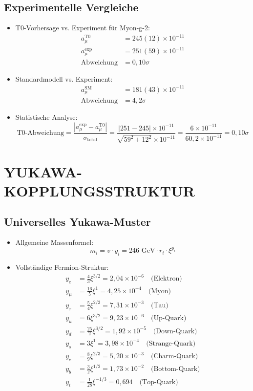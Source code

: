 \documentclass[12pt,a4paper]{article}
\begin{document}
\subsection{Experimentelle Vergleiche}
\begin{itemize}
	\item T0-Vorhersage vs. Experiment f\"{u}r Myon-g-2:
	\begin{align*}
		a_\mu^{\text{T0}} &= 245(12) \times 10^{-11}\\
		a_\mu^{\text{exp}} &= 251(59) \times 10^{-11}\\
		\text{Abweichung} &= 0,10\sigma
	\end{align*}
	
	\item Standardmodell vs. Experiment:
	\begin{align*}
		a_\mu^{\text{SM}} &= 181(43) \times 10^{-11}\\
		\text{Abweichung} &= 4,2\sigma
	\end{align*}
	
	\item Statistische Analyse:
	$$\text{T0-Abweichung} = \frac{|a_\mu^{\text{exp}} - a_\mu^{\text{T0}}|}{\sigma_{\text{total}}} = \frac{|251 - 245| \times 10^{-11}}{\sqrt{59^2 + 12^2} \times 10^{-11}} = \frac{6 \times 10^{-11}}{60,2 \times 10^{-11}} = 0,10\sigma$$
\end{itemize}
\section{YUKAWA-KOPPLUNGSSTRUKTUR}

\subsection{Universelles Yukawa-Muster}
\begin{itemize}
	\item Allgemeine Massenformel:
	$$m_i = v \cdot y_i = 246 \text{ GeV} \cdot r_i \cdot \xi^{p_i}$$
	
	\item Vollständige Fermion-Struktur:
	\begin{align*}
		y_e &= \frac{4}{3}\xi^{3/2} = 2{,}04 \times 10^{-6} \quad \text{(Elektron)}\\
		y_\mu &= \frac{16}{5}\xi^1 = 4{,}25 \times 10^{-4} \quad \text{(Myon)}\\
		y_\tau &= \frac{5}{4}\xi^{2/3} = 7{,}31 \times 10^{-3} \quad \text{(Tau)}\\
		y_u &= 6\xi^{3/2} = 9{,}23 \times 10^{-6} \quad \text{(Up-Quark)}\\
		y_d &= \frac{25}{2}\xi^{3/2} = 1{,}92 \times 10^{-5} \quad \text{(Down-Quark)}\\
		y_s &= 3\xi^1 = 3{,}98 \times 10^{-4} \quad \text{(Strange-Quark)}\\
		y_c &= \frac{8}{9}\xi^{2/3} = 5{,}20 \times 10^{-3} \quad \text{(Charm-Quark)}\\
		y_b &= \frac{3}{2}\xi^{1/2} = 1{,}73 \times 10^{-2} \quad \text{(Bottom-Quark)}\\
		y_t &= \frac{1}{28}\xi^{-1/3} = 0{,}694 \quad \text{(Top-Quark)}
	\end{align*}
\end{itemize}
\end{document}
